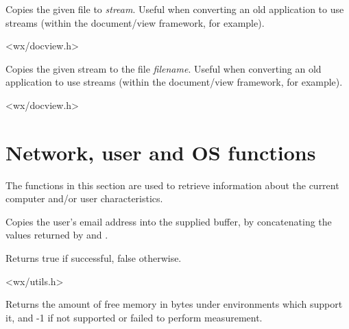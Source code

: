 \label{wxtransferfiletostream}


Copies the given file to {\it stream}. Useful when converting an old application to
use streams (within the document/view framework, for example).


<wx/docview.h>


\label{wxtransferstreamtofile}


Copies the given stream to the file {\it filename}. Useful when converting an old application to
use streams (within the document/view framework, for example).


<wx/docview.h>



\section{Network, user and OS functions}\label{networkfunctions}

The functions in this section are used to retrieve information about the
current computer and/or user characteristics.


\label{wxgetemailaddress}



Copies the user's email address into the supplied buffer, by
concatenating the values returned by \rtfsp
and .

Returns true if successful, false otherwise.


<wx/utils.h>


\label{wxgetfreememory}


Returns the amount of free memory in bytes under environments which
support it, and -1 if not supported or failed to perform measurement.

